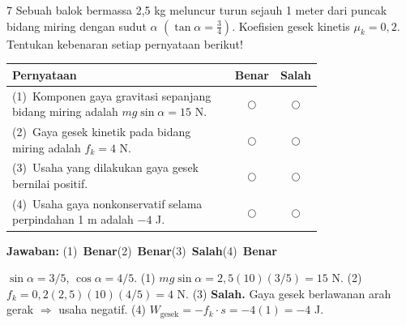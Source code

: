 \documentclass[11pt]{article}
\newcommand{\jawaban}[1]{%
  \noindent\colorbox{gold!30}{\parbox{\dimexpr\linewidth-2\fboxsep\relax}{%
    \textbf{Jawaban:} #1}}\par\smallskip}
\begin{document}
\begin{soal}{7}  %
Sebuah balok bermassa 2,5 kg meluncur turun sejauh 1 meter dari
puncak bidang miring dengan sudut $\alpha$ $\left(\tan\alpha=\tfrac{3}{4}\right)$.
Koefisien gesek kinetis $\mu_k=0{,}2$. Tentukan kebenaran setiap
pernyataan berikut!

\par\smallskip
{\renewcommand{\arraystretch}{1.4}%
\begin{tabular}{@{}p{0.76\linewidth}cc@{}}
\hline
\textbf{Pernyataan} & \textbf{Benar} & \textbf{Salah}\\
\hline
(1)~Komponen gaya gravitasi sepanjang bidang miring adalah
    $mg\sin\alpha=15$ N.
  & $\bigcirc$ & $\bigcirc$\\
(2)~Gaya gesek kinetik pada bidang miring adalah $f_k=4$ N.
  & $\bigcirc$ & $\bigcirc$\\
(3)~Usaha yang dilakukan gaya gesek bernilai positif.
  & $\bigcirc$ & $\bigcirc$\\
(4)~Usaha gaya nonkonservatif selama perpindahan 1 m adalah $-4$ J.
  & $\bigcirc$ & $\bigcirc$\\
\hline
\end{tabular}}
\end{soal}
\begin{pembox}
\jawaban{(1)~\textbf{Benar}\quad(2)~\textbf{Benar}\quad(3)~\textbf{Salah}\quad(4)~\textbf{Benar}}
$\sin\alpha=3/5$, $\cos\alpha=4/5$.
(1) $mg\sin\alpha = 2{,}5(10)(3/5)=15$ N. \checkmark
(2) $f_k = 0{,}2(2{,}5)(10)(4/5)=4$ N. \checkmark
(3) \textbf{Salah.} Gaya gesek berlawanan arah gerak $\Rightarrow$ usaha negatif.
(4) $W_{\text{gesek}} = -f_k \cdot s = -4(1)=-4$ J. \checkmark
\end{pembox}
\end{document}

